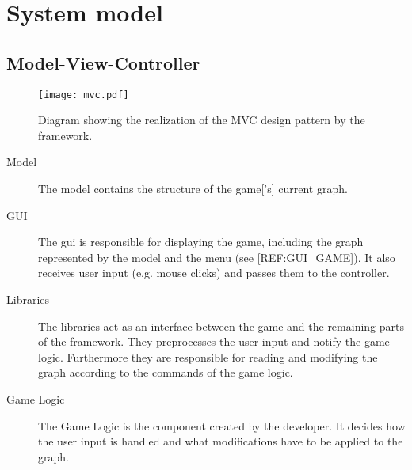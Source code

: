 \section{System model}

\subsection{Model-View-Controller}


\begin{figure}[h]
	\centering
	\texttt{[image: mvc.pdf]}
	\caption{Diagram showing the realization of the \gls{MVC} design pattern by the framework.}
	\label{img:MVC}
\end{figure}

\begin{description}
\item[Model] The model contains the structure of the \gls{game}['s] current \gls{graph}.
\item[GUI] The \gls{gui} is responsible for displaying the game, including the \gls{graph} represented by the model and the menu (see \ref{REF:GUI_GAME}). It also receives user input (e.g. mouse clicks) and passes them to the controller.
\item[Libraries] The libraries act as an interface between the game and the remaining parts of the framework. They preprocesses the user input and notify the game logic. Furthermore they are responsible for reading and modifying the \gls{graph} according to the commands of the game logic.
\item[Game Logic] The Game Logic is the component created by the \gls{developer}. It decides how the user input is handled and what modifications have to be applied to the \gls{graph}.
\end{description}